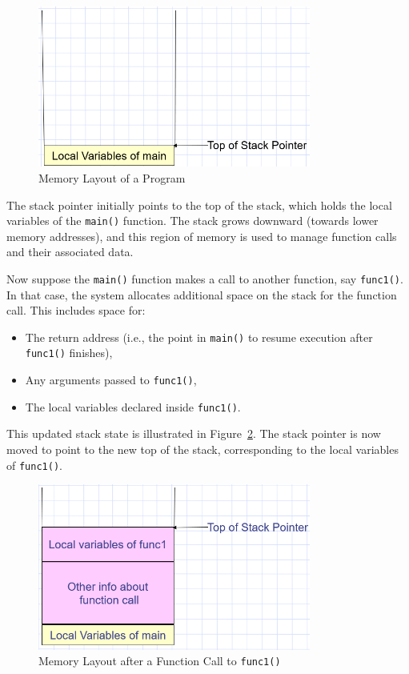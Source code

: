 \documentclass[12pt]{book}
\begin{document}
\begin{figure}[h!]
    \centering
    \includegraphics[width=0.8\textwidth]{images/memory_layout.png}
    \caption{Memory Layout of a Program}
    \label{fig:memory_layout}
\end{figure}

The stack pointer initially points to the top of the stack, which holds the local variables of the \texttt{main()} function. The stack grows downward (towards lower memory addresses), and this region of memory is used to manage function calls and their associated data.

Now suppose the \texttt{main()} function makes a call to another function, say \texttt{func1()}. In that case, the system allocates additional space on the stack for the function call. This includes space for:
\begin{itemize}
    \item The return address (i.e., the point in \texttt{main()} to resume execution after \texttt{func1()} finishes),
    \item Any arguments passed to \texttt{func1()},
    \item The local variables declared inside \texttt{func1()}.
\end{itemize}

This updated stack state is illustrated in Figure~\ref{fig:memory_layout_func1}. The stack pointer is now moved to point to the new top of the stack, corresponding to the local variables of \texttt{func1()}.

\begin{figure}[h!]
    \centering
    \includegraphics[width=0.8\textwidth]{images/memory_layout_func1.png}
    \caption{Memory Layout after a Function Call to \texttt{func1()}}
    \label{fig:memory_layout_func1}
\end{figure}
\end{document}
